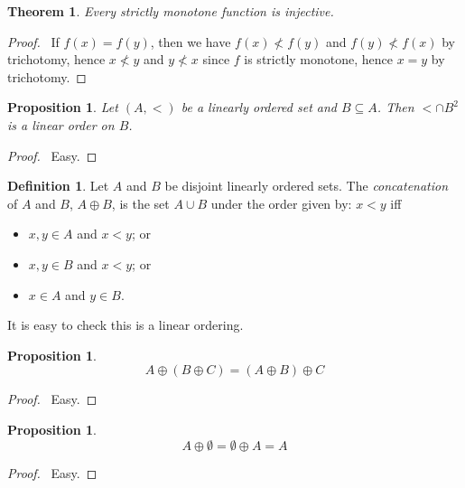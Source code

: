 \documentclass{report}
\let\qed\relax
\newtheorem{proposition}[axiom]{Proposition}
\newtheorem{theorem}[axiom]{Theorem}
\theoremstyle{definition}
\newtheorem{definition}[axiom]{Definition}
\begin{document}
    \begin{theorem}
        Every strictly monotone function is injective.
    \end{theorem}

    \begin{proof}
        \pf\ If $f(x) = f(y)$, then we have $f(x) \not < f(y)$ and $f(y) \not < f(x)$ by trichotomy,
        hence $x \not < y$ and $y \not < x$ since $f$ is strictly monotone, hence $x = y$ by
        trichotomy. \qed
    \end{proof}

    \begin{proposition}
        Let $(A, <)$ be a linearly ordered set and $B \subseteq A$. Then $< \cap B^2$ is a linear order on $B$.
    \end{proposition}

    \begin{proof}
        \pf\ Easy. \qed
    \end{proof}

    \begin{definition}
        Let $A$ and $B$ be disjoint linearly ordered sets. The \emph{concatenation} of $A$ and $B$,
        $A \oplus B$, is the set $A \cup B$ under the order given by: $x < y$ iff
        \begin{itemize}
            \item $x, y \in A$ and $x < y$; or
            \item $x, y \in B$ and $x < y$; or
            \item $x \in A$ and $y \in B$.
        \end{itemize}

        It is easy to check this is a linear ordering.
    \end{definition}

    \begin{proposition}
        \[ A \oplus (B \oplus C) = (A \oplus B) \oplus C \]
    \end{proposition}

    \begin{proof}
        \pf\ Easy. \qed
    \end{proof}

    \begin{proposition}
        \[ A \oplus \emptyset = \emptyset \oplus A = A \]
    \end{proposition}

    \begin{proof}
        \pf\ Easy. \qed
    \end{proof}
\end{document}
